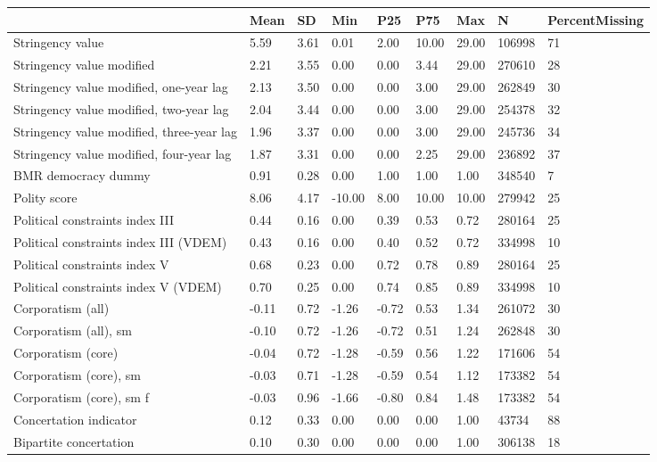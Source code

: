 
\begin{longtable}{lllllllll}
\toprule
  & Mean & SD & Min & P25 & P75 & Max & N & PercentMissing\\
\midrule
Stringency value & 5.59 & 3.61 & 0.01 & 2.00 & 10.00 & 29.00 & 106998 & 71\\
Stringency value modified & 2.21 & 3.55 & 0.00 & 0.00 & 3.44 & 29.00 & 270610 & 28\\
Stringency value modified, one-year lag & 2.13 & 3.50 & 0.00 & 0.00 & 3.00 & 29.00 & 262849 & 30\\
Stringency value modified, two-year lag & 2.04 & 3.44 & 0.00 & 0.00 & 3.00 & 29.00 & 254378 & 32\\
Stringency value modified, three-year lag & 1.96 & 3.37 & 0.00 & 0.00 & 3.00 & 29.00 & 245736 & 34\\
\addlinespace
Stringency value modified, four-year lag & 1.87 & 3.31 & 0.00 & 0.00 & 2.25 & 29.00 & 236892 & 37\\
BMR democracy dummy & 0.91 & 0.28 & 0.00 & 1.00 & 1.00 & 1.00 & 348540 & 7\\
Polity score & 8.06 & 4.17 & -10.00 & 8.00 & 10.00 & 10.00 & 279942 & 25\\
Political constraints index III & 0.44 & 0.16 & 0.00 & 0.39 & 0.53 & 0.72 & 280164 & 25\\
Political constraints index III (VDEM) & 0.43 & 0.16 & 0.00 & 0.40 & 0.52 & 0.72 & 334998 & 10\\
\addlinespace
Political constraints index V & 0.68 & 0.23 & 0.00 & 0.72 & 0.78 & 0.89 & 280164 & 25\\
Political constraints index V (VDEM) & 0.70 & 0.25 & 0.00 & 0.74 & 0.85 & 0.89 & 334998 & 10\\
Corporatism (all) & -0.11 & 0.72 & -1.26 & -0.72 & 0.53 & 1.34 & 261072 & 30\\
Corporatism (all), sm & -0.10 & 0.72 & -1.26 & -0.72 & 0.51 & 1.24 & 262848 & 30\\
Corporatism (core) & -0.04 & 0.72 & -1.28 & -0.59 & 0.56 & 1.22 & 171606 & 54\\
\addlinespace
Corporatism (core), sm & -0.03 & 0.71 & -1.28 & -0.59 & 0.54 & 1.12 & 173382 & 54\\
Corporatism (core), sm f & -0.03 & 0.96 & -1.66 & -0.80 & 0.84 & 1.48 & 173382 & 54\\
Concertation indicator & 0.12 & 0.33 & 0.00 & 0.00 & 0.00 & 1.00 & 43734 & 88\\
Bipartite concertation & 0.10 & 0.30 & 0.00 & 0.00 & 0.00 & 1.00 & 306138 & 18\\

\end{longtable}
